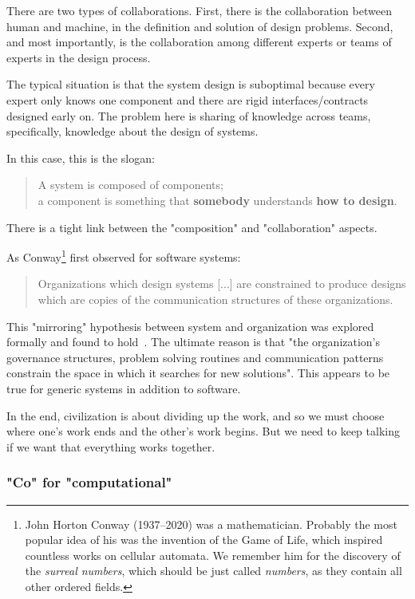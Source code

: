 There are two types of collaborations. First, there is the collaboration  between human and machine, in the definition and solution of design problems. Second, and most importantly, is the collaboration among different experts or teams of experts in the design process.

The typical situation is that the system design is suboptimal because every expert only knows one component and there are rigid interfaces/contracts designed early on. The problem here is sharing of knowledge across teams, specifically, knowledge about the design of systems.

In this case, this is the slogan:
 

\begin{quote}
    A system is composed of components;\\
      a component is something that \textbf{somebody} understands
      \textbf{how to design}.
\end{quote}


There is a tight link between the "composition" and "collaboration" aspects.

As Conway\footnote{John Horton Conway (1937--2020) was a mathematician. Probably the most 
popular idea of his was the invention of the Game of Life, which inspired countless
works on cellular automata. We remember him for the discovery of the \emph{surreal numbers},
which should be just called \emph{numbers}, as they contain all other ordered fields.} first observed for software systems:

\begin{quote}
Organizations which design systems [...] are constrained to produce designs which are copies of the communication structures of these organizations.
\end{quote}
 

This "mirroring" hypothesis between system and organization was explored formally and found to hold~\cite{maccormack12exploring}. The ultimate reason is that "the organization's governance structures, problem solving routines and communication patterns constrain the space in which it searches for new solutions". This appears to be true for generic systems in addition to software.

In the end, civilization is about dividing up the work, and so we must choose where one's work ends and the other's work begins. But we need to keep talking if we want that everything works together.
 

\subsubsection{"Co" for "computational"}

